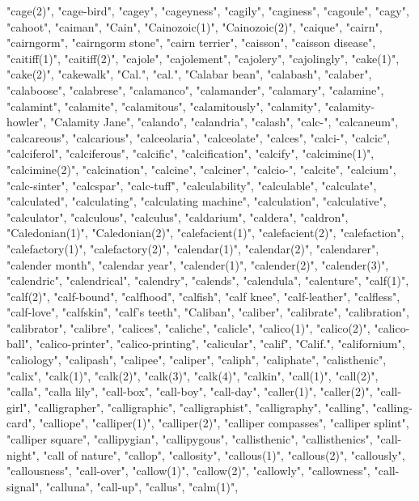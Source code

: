 "cage(2)",
"cage-bird",
"cagey",
"cageyness",
"cagily",
"caginess",
"cagoule",
"cagy",
"cahoot",
"caiman",
"Cain",
"Cainozoic(1)",
"Cainozoic(2)",
"caique",
"cairn",
"cairngorm",
"cairngorm stone",
"cairn terrier",
"caisson",
"caisson disease",
"caitiff(1)",
"caitiff(2)",
"cajole",
"cajolement",
"cajolery",
"cajolingly",
"cake(1)",
"cake(2)",
"cakewalk",
"Cal.",
"cal.",
"Calabar bean",
"calabash",
"calaber",
"calaboose",
"calabrese",
"calamanco",
"calamander",
"calamary",
"calamine",
"calamint",
"calamite",
"calamitous",
"calamitously",
"calamity",
"calamity-howler",
"Calamity Jane",
"calando",
"calandria",
"calash",
"calc-",
"calcaneum",
"calcareous",
"calcarious",
"calceolaria",
"calceolate",
"calces",
"calci-",
"calcic",
"calciferol",
"calciferous",
"calcific",
"calcification",
"calcify",
"calcimine(1)",
"calcimine(2)",
"calcination",
"calcine",
"calciner",
"calcio-",
"calcite",
"calcium",
"calc-sinter",
"calcspar",
"calc-tuff",
"calculability",
"calculable",
"calculate",
"calculated",
"calculating",
"calculating machine",
"calculation",
"calculative",
"calculator",
"calculous",
"calculus",
"caldarium",
"caldera",
"caldron",
"Caledonian(1)",
"Caledonian(2)",
"calefacient(1)",
"calefacient(2)",
"calefaction",
"calefactory(1)",
"calefactory(2)",
"calendar(1)",
"calendar(2)",
"calendarer",
"calender month",
"calendar year",
"calender(1)",
"calender(2)",
"calender(3)",
"calendric",
"calendrical",
"calendry",
"calends",
"calendula",
"calenture",
"calf(1)",
"calf(2)",
"calf-bound",
"calfhood",
"calfish",
"calf knee",
"calf-leather",
"calfless",
"calf-love",
"calfskin",
"calf's teeth",
"Caliban",
"caliber",
"calibrate",
"calibration",
"calibrator",
"calibre",
"calices",
"caliche",
"calicle",
"calico(1)",
"calico(2)",
"calico-ball",
"calico-printer",
"calico-printing",
"calicular",
"calif",
"Calif.",
"californium",
"caliology",
"calipash",
"calipee",
"caliper",
"caliph",
"caliphate",
"calisthenic",
"calix",
"calk(1)",
"calk(2)",
"calk(3)",
"calk(4)",
"calkin",
"call(1)",
"call(2)",
"calla",
"calla lily",
"call-box",
"call-boy",
"call-day",
"caller(1)",
"caller(2)",
"call-girl",
"calligrapher",
"calligraphic",
"calligraphist",
"calligraphy",
"calling",
"calling-card",
"calliope",
"calliper(1)",
"calliper(2)",
"calliper compasses",
"calliper splint",
"calliper square",
"callipygian",
"callipygous",
"callisthenic",
"callisthenics",
"call-night",
"call of nature",
"callop",
"callosity",
"callous(1)",
"callous(2)",
"callously",
"callousness",
"call-over",
"callow(1)",
"callow(2)",
"callowly",
"callowness",
"call-signal",
"calluna",
"call-up",
"callus",
"calm(1)",
